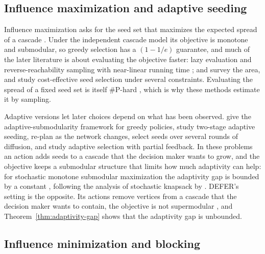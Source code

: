 \documentclass[preprint,11pt]{elsarticle}
\theoremstyle{definition}
\theoremstyle{remark}
\begin{document}
\subsection{Influence maximization and adaptive seeding}

Influence maximization asks for the seed set that maximizes the expected spread of a cascade \citep{kempe2003}. Under the independent cascade model its objective is monotone and submodular, so greedy selection has a $(1-1/e)$ guarantee, and much of the later literature is about evaluating the objective faster: lazy evaluation \citep{leskovec2007b} and reverse-reachability sampling with near-linear running time \citep{borgs2014,tang2014}; \citet{li2018} and \citet{zareie2023} survey the area, and \citet{biswas2024} study cost-effective seed selection under several constraints. Evaluating the spread of a fixed seed set is itself \#P-hard \citep{chen2010}, which is why these methods estimate it by sampling.

Adaptive versions let later choices depend on what has been observed. \citet{golovinkrause2011} give the adaptive-submodularity framework for greedy policies, \citet{seemansinger2013} study two-stage adaptive seeding, \citet{tong2017} re-plan as the network changes, \citet{sun2018} select seeds over several rounds of diffusion, and \citet{yuan2017} study adaptive selection with partial feedback. In these problems an action adds seeds to a cascade that the decision maker wants to grow, and the objective keeps a submodular structure that limits how much adaptivity can help: for stochastic monotone submodular maximization the adaptivity gap is bounded by a constant \citep{asadpournazerzadeh2016}, following the analysis of stochastic knapsack by \citet{deangoemansvondrak2008}. DEFER's setting is the opposite. Its actions remove vertices from a cascade that the decision maker wants to contain, the objective is not supermodular \citep{xie2023}, and Theorem~\ref{thm:adaptivity-gap} shows that the adaptivity gap is unbounded.

\subsection{Influence minimization and blocking}
\end{document}

